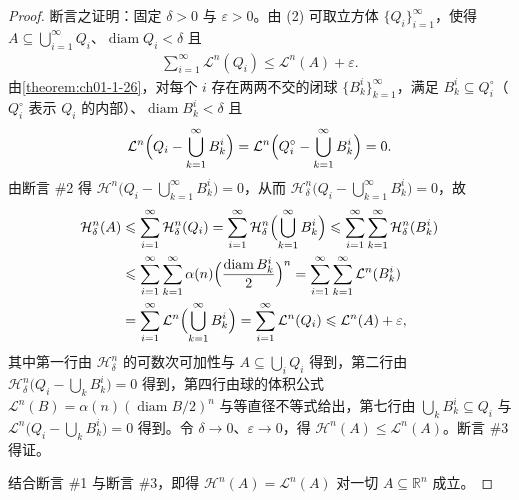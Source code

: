 \documentclass[../../main.tex]{subfiles}%
\begin{document}
\begin{proof}
断言之证明：固定 $\delta>0$ 与 $\varepsilon>0$。由 (2) 可取立方体 $\{Q_i\}_{i=1}^{\infty}$，使得 $A\subseteq\bigcup_{i=1}^{\infty}Q_i$、$\operatorname{diam}Q_i<\delta$ 且
\begin{align*}
\sum_{i=1}^{\infty}\mathcal{L}^n(Q_i)\leqslant\mathcal{L}^n(A)+\varepsilon .
\end{align*}
由\cref{theorem:ch01-1-26}，对每个 $i$ 存在两两不交的闭球 $\{B_k^i\}_{k=1}^{\infty}$，满足 $B_k^i\subseteq Q_i^{\circ}$（$Q_i^{\circ}$ 表示 $Q_i$ 的内部）、$\operatorname{diam}B_k^i<\delta$ 且%
\begin{align*}
\mathcal{L}^n\Bigl(Q_i-\bigcup_{k=1}^{\infty}B_k^i\Bigr)=\mathcal{L}^n\Bigl(Q_i^{\circ}-\bigcup_{k=1}^{\infty}B_k^i\Bigr)=0 .
\end{align*}
由断言 \#2 得 $\mathcal{H}^n\bigl(Q_i-\bigcup_{k=1}^{\infty}B_k^i\bigr)=0$，从而 $\mathcal{H}^n_\delta\bigl(Q_i-\bigcup_{k=1}^{\infty}B_k^i\bigr)=0$，故
\begin{align*}
\mathcal{H}^n_\delta(A)
&\leqslant\sum_{i=1}^{\infty}\mathcal{H}^n_\delta(Q_i)
=\sum_{i=1}^{\infty}\mathcal{H}^n_\delta\Bigl(\bigcup_{k=1}^{\infty}B_k^i\Bigr)
\leqslant\sum_{i=1}^{\infty}\sum_{k=1}^{\infty}\mathcal{H}^n_\delta(B_k^i)\\
&\leqslant\sum_{i=1}^{\infty}\sum_{k=1}^{\infty}\alpha(n)\Bigl(\frac{\operatorname{diam}B_k^i}{2}\Bigr)^n
=\sum_{i=1}^{\infty}\sum_{k=1}^{\infty}\mathcal{L}^n(B_k^i)\\
&=\sum_{i=1}^{\infty}\mathcal{L}^n\Bigl(\bigcup_{k=1}^{\infty}B_k^i\Bigr)
=\sum_{i=1}^{\infty}\mathcal{L}^n(Q_i)
\leqslant\mathcal{L}^n(A)+\varepsilon ,
\end{align*}
其中第一行由 $\mathcal{H}^n_\delta$ 的可数次可加性与 $A\subseteq\bigcup_i Q_i$ 得到，第二行由 $\mathcal{H}^n_\delta\bigl(Q_i-\bigcup_k B_k^i\bigr)=0$ 得到，第四行由球的体积公式 $\mathcal{L}^n(B)=\alpha(n)(\operatorname{diam}B/2)^n$ 与等直径不等式给出，第七行由 $\bigcup_k B_k^i\subseteq Q_i$ 与 $\mathcal{L}^n\bigl(Q_i-\bigcup_k B_k^i\bigr)=0$ 得到。令 $\delta\to0$、$\varepsilon\to0$，得 $\mathcal{H}^n(A)\leqslant\mathcal{L}^n(A)$。断言 \#3 得证。

结合断言 \#1 与断言 \#3，即得 $\mathcal{H}^n(A)=\mathcal{L}^n(A)$ 对一切 $A\subseteq\mathbb{R}^n$ 成立。
\end{proof}
\end{document}
